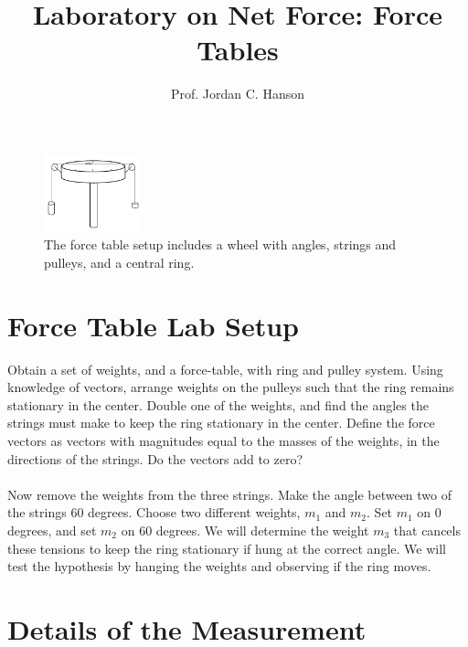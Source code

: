 \documentclass{article}
\begin{document}
\twocolumn

\title{Laboratory on Net Force: Force Tables}
\author{Prof. Jordan C. Hanson}

\maketitle

\begin{figure}[ht]
\centering
\includegraphics[width=0.25\textwidth]{figures/Table.pdf}
\caption{\label{fig:table} The force table setup includes a wheel with angles, strings and pulleys, and a central ring.}
\end{figure}

\section{Force Table Lab Setup}

Obtain a set of weights, and a force-table, with ring and pulley system.  Using knowledge of vectors, arrange weights on the pulleys such that the ring remains stationary in the center.  Double one of the weights, and find the angles the strings must make to keep the ring stationary in the center.  Define the force vectors as vectors with magnitudes equal to the masses of the weights, in the directions of the strings.  Do the vectors add to zero?
\noindent
\\ \\
Now remove the weights from the three strings.  Make the angle between two of the strings 60 degrees.  Choose two different weights, $m_1$ and $m_2$.  Set $m_1$ on 0 degrees, and set $m_2$ on 60 degrees.  We will determine the weight $m_3$ that cancels these tensions to keep the ring stationary if hung at the correct angle.  We will test the hypothesis by hanging the weights and observing if the ring moves.

\section{Details of the Measurement}
\end{document}
